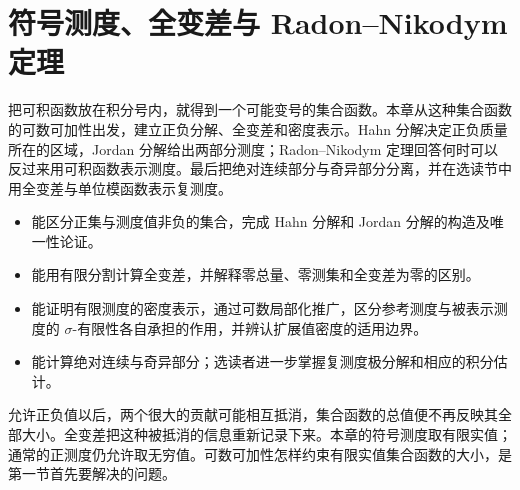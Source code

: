\chapter{符号测度、全变差与 Radon–Nikodym 定理}
\label{b1:ch:06}
\begin{chapterabstract}
把可积函数放在积分号内，就得到一个可能变号的集合函数。本章从这种集合函数的可数可加性出发，建立正负分解、全变差和密度表示。Hahn 分解决定正负质量所在的区域，Jordan 分解给出两部分测度；Radon--Nikodym 定理回答何时可以反过来用可积函数表示测度。最后把绝对连续部分与奇异部分分离，并在选读节中用全变差与单位模函数表示复测度。
\end{chapterabstract}

\begin{learninggoals}
\begin{itemize}
\item\label{b1:item:0600-goal-1}能区分正集与测度值非负的集合，完成 Hahn 分解和 Jordan 分解的构造及唯一性论证。
\item\label{b1:item:0600-goal-2}能用有限分割计算全变差，并解释零总量、零测集和全变差为零的区别。
\item\label{b1:item:0600-goal-3}能证明有限测度的密度表示，通过可数局部化推广，区分参考测度与被表示测度的 \(\sigma\)-有限性各自承担的作用，并辨认扩展值密度的适用边界。
\item\label{b1:item:0600-goal-4}能计算绝对连续与奇异部分；选读者进一步掌握复测度极分解和相应的积分估计。
\end{itemize}
\end{learninggoals}

允许正负值以后，两个很大的贡献可能相互抵消，集合函数的总值便不再反映其全部大小。全变差把这种被抵消的信息重新记录下来。本章的符号测度取有限实值；通常的正测度仍允许取无穷值。可数可加性怎样约束有限实值集合函数的大小，是第一节首先要解决的问题。

\ProseParagraphBreak

